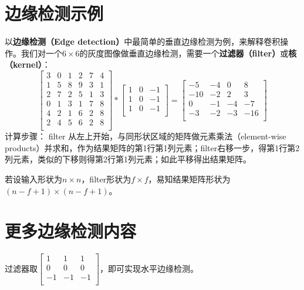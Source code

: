 \documentclass[../../main.tex]{subfiles}
\begin{document}
\section{边缘检测示例}
以\textbf{边缘检测（Edge detection）}中最简单的垂直边缘检测为例，来解释卷积操作。我们对一个\(6×6\)的灰度图像做垂直边缘检测，需要一个\textbf{过滤器（filter）}或\textbf{核（kernel）}：
\[
    \begin{bmatrix}
        3 & 0 & 1 & 2 & 7 & 4 \\
        1 & 5 & 8 & 9 & 3 & 1 \\
        2 & 7 & 2 & 5 & 1 & 3 \\
        0 & 1 & 3 & 1 & 7 & 8 \\
        4 & 2 & 1 & 6 & 2 & 8 \\
        2 & 4 & 5 & 6 & 2 & 8 \\
    \end{bmatrix}
    *
    \begin{bmatrix}
        1 & 0 & -1 \\
        1 & 0 & -1 \\
        1 & 0 & -1 \\
    \end{bmatrix}
    =
    \begin{bmatrix}
        -5  & -4 & 0  & 8   \\
        -10 & -2 & 2  & 3   \\
        0   & -1 & -4 & -7  \\
        -3  & -2 & -3 & -16 \\
    \end{bmatrix}
\]
计算步骤：
filter 从左上开始，与同形状区域的矩阵做元素乘法（element-wise products）并求和，作为结果矩阵的第1行第1列元素；filter右移一步，得第1行第2列元素，类似的下移则得第2行第1列元素；如此平移得出结果矩阵。

若设输入形状为\(n×n\)，filter形状为\(f×f\)，易知结果矩阵形状为\((n-f+1)×(n-f+1)\)。

\section{更多边缘检测内容}
过滤器取\(
\begin{bmatrix}
    1  & 1  & 1  \\
    0  & 0  & 0  \\
    -1 & -1 & -1 \\
\end{bmatrix}
\)，即可实现水平边缘检测。
\end{document}
